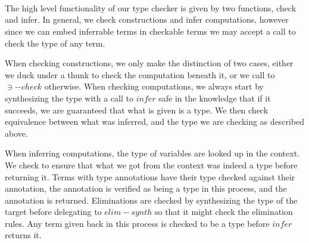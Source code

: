 {\begin{code}
\AgdaSpace{}%
\AgdaSymbol{)}\AgdaSpace{}%
\AgdaSymbol{=}%
\>[265I]\<%
\\
\>[265I][@{}l@{\AgdaIndent{0}}]%
\>[35]\AgdaSymbol{\AgdaUnderscore{}}\AgdaSpace{}%
\AgdaSpace{}%
\AgdaSpace{}%
\AgdaSpace{}%
\<%
\\
%
\>[35]\AgdaSpace{}%
\<%
\\
\>[0]\AgdaCatchallClause{\AgdaSymbol{\AgdaUnderscore{}}}\AgdaSpace{}%
\AgdaSpace{}%
\AgdaCatchallClause{\AgdaSymbol{\AgdaUnderscore{}}}%
\>[8]\AgdaSymbol{=}\AgdaSpace{}%
\<%
\end{code}
}

The high level functionality of our type checker is given by two functions,
check and infer. In general, we check constructions and infer computations,
however since we can embed inferrable terms in checkable terms we may accept
a call to check the type of any term.

When checking constructions, we only make the distinction of two cases,
either we duck under a thunk to check the computation beneath it, or we
call to $∋-check$ otherwise. When checking computations, we always start
by synthesizing the type with a call to $infer$ safe in the knowledge that
if it succeeds, we are guaranteed that what is given is a type. We then check
equivalence between what was inferred, and the type we are checking as
described above.

When inferring computations, the type of variables are looked up in the
context. We check to ensure that what we got from the context was indeed
a type before returning it. Terms with type annotations have their
type checked against their annotation, the annotation is verified as being
a type in this process, and the annotation is returned. Eliminations are
checked by synthesizing the type of the target before delegating to $elim-synth$
so that it might check the elimination rules. Any term given back in this
process is checked to be a type before $infer$ returns it.

